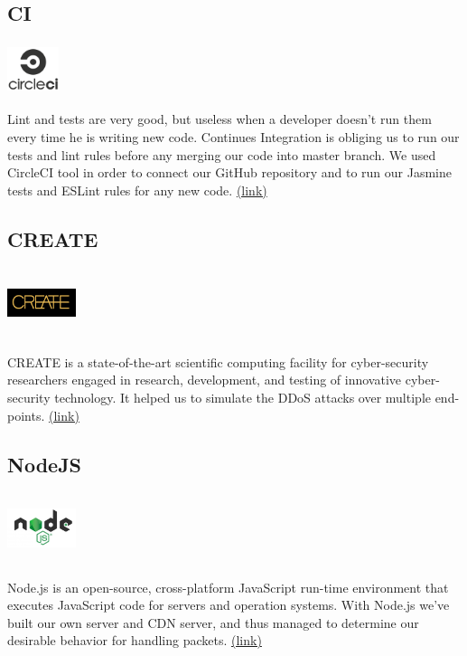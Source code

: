 \documentclass{report}
\begin{document}
\subsection {CI}
     \begin{minipage}{\linewidth}
            \includegraphics[width=1.5cm,height=1.5cm,keepaspectratio]{circleci}
        \end{minipage}
\hfill \break
Lint and tests are very good, but useless when a developer doesn’t run them every time he is writing new code. Continues Integration is obliging us to run our tests and lint rules before any merging our code into master branch. We used CircleCI tool in order to connect our GitHub repository and to run our Jasmine tests and ESLint rules for any new code.
\href{https://circleci.com/}{(link)} 


\newpage

\subsection {CREATE}
     \begin{minipage}{\linewidth}
            \includegraphics[width=2cm,height=2cm,keepaspectratio]{create}
        \end{minipage}
\hfill \break
CREATE is a state-of-the-art scientific computing facility for cyber-security researchers engaged in research, development, and testing of innovative cyber-security technology. It helped us to simulate the \gls{DDoS} attacks over multiple end-points.
\href{https://https://create.iucc.ac.il/}{(link)} 

\subsection {NodeJS}
     \begin{minipage}{\linewidth}
            \includegraphics[width=2cm,height=2cm,keepaspectratio]{js}
        \end{minipage}
\hfill \break
Node.js is an open-source, cross-platform JavaScript run-time environment that executes JavaScript code for servers and operation systems. With Node.js we’ve built our own server and \gls{CDN} server, and thus managed to determine our desirable behavior for handling packets.
\href{https://nodejs.org/}{(link)} 
\end{document}
